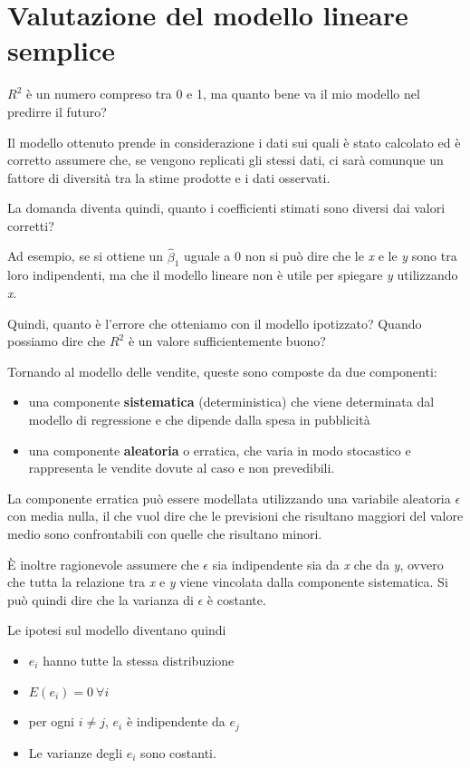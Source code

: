 \section{Valutazione del modello lineare semplice}\label{i-residui}

$R^{2}$ è un numero compreso tra 0 e 1, ma quanto bene va il mio
modello nel predirre il futuro?

Il modello ottenuto prende in considerazione i dati sui quali è stato
calcolato ed è corretto assumere che, se vengono replicati gli stessi
dati, ci sarà comunque un fattore di diversità tra la stime prodotte e i
dati osservati.

La domanda diventa quindi, quanto i coefficienti stimati sono diversi dai
valori corretti? 

Ad esempio, se si ottiene un $\hat{\beta}_1$ uguale a 0 non si può dire che le \emph{x} e le \emph{y} sono tra loro
indipendenti, ma che il modello lineare non è utile per spiegare \emph{y} utilizzando \emph{x}.

Quindi, quanto è l'errore che otteniamo con il modello ipotizzato?
Quando possiamo dire che $R^2$ è un valore sufficientemente
buono?

Tornando al modello delle vendite, queste sono composte da due
componenti:

\begin{itemize}
\item
  una componente \textbf{sistematica} (deterministica) che viene
  determinata dal modello di regressione e che dipende dalla spesa in
  pubblicità
\item
  una componente \textbf{aleatoria} o erratica, che varia in modo
  stocastico e rappresenta le vendite dovute al caso e non prevedibili.
\end{itemize}

La componente erratica può essere modellata utilizzando una variabile
aleatoria $\epsilon$ con media nulla, il che vuol dire che le
previsioni che risultano maggiori del valore medio sono confrontabili
con quelle che risultano minori.

È inoltre ragionevole assumere che $\epsilon$ sia indipendente sia
da \emph{x} che da \emph{y}, ovvero che tutta la relazione tra \emph{x}
e \emph{y} viene vincolata dalla componente sistematica. Si può
quindi dire che la varianza di $\epsilon$ è costante.

Le ipotesi sul modello diventano quindi

\begin{itemize}
\item
  $e_i$ hanno tutte la stessa distribuzione
\item
  $E(e_i) = 0 \: \forall i$
\item
  per ogni $i\neq j$, $e_i$ è indipendente da $e_j$
\item
  Le varianze degli $e_i$ sono costanti.
\end{itemize}

